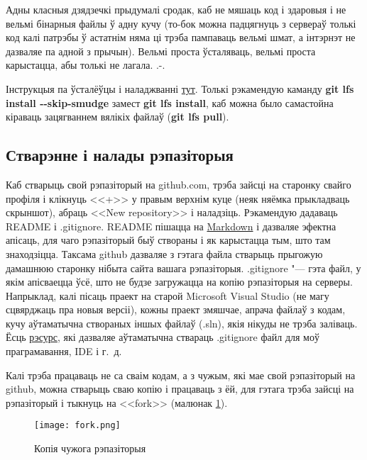 Адны класныя дзядзечкі прыдумалі сродак, каб не мяшаць код і здаровыя і не вельмі бінарныя файлы ў адну кучу (то-бок можна падцягнуць з сервераў толькі код калі патрэбы ў астатнім няма ці трэба пампаваць вельмі шмат, а інтэрнэт не дазваляе па адной з прычын). Вельмі проста ўсталяваць, вельмі проста карыстацца, абы толькі не лагала. .-.

Інструкцыя па ўсталёўцы і наладжванні \href{https://github.com/git-lfs/git-lfs}{тут}. Толькі рэкамендую каманду \textbf{git lfs install -\hspace{1pt}-skip-smudge} замест \textbf{git lfs install}, каб можна было самастойна кіраваць зацягваннем вялікіх файлаў (\textbf{git lfs pull}). 

\subsection{Стварэнне і налады рэпазіторыя}

Каб стварыць свой рэпазіторый на github.com, трэба зайсці на старонку свайго профіля і клікнуць <<+>> у правым верхнім куце (неяк няёмка прыкладваць скрыншот), абраць <<New repository>> і наладзіць. Рэкамендую дадаваць README і .gitignore. README пішацца на \href{https://en.wikipedia.org/wiki/Markdown}{Markdown} і дазваляе эфектна апісаць, для чаго рэпазіторый быў створаны і як карыстацца тым, што там знаходзіцца. Таксама github дазваляе з гэтага файла стварыць прыгожую дамашнюю старонку нібыта сайта вашага рэпазіторыя. .gitignore "--- гэта файл, у якім апісваецца ўсё, што не будзе загружацца на копію рэпазіторыя на серверы. Напрыклад, калі пісаць праект на старой Microsoft Visual Studio (не магу сцвярджаць пра новыя версіі), кожны праект змяшчае, апрача файлаў з кодам, кучу аўтаматычна створаных іншых файлаў (.sln), якія нікуды не трэба заліваць. Ёсць \href{https://www.gitignore.io}{рэсурс}, які дазваляе аўтаматычна ствараць .gitignore файл для моў праграмавання, IDE і г.~д.

Калі трэба працаваць не са сваім кодам, а з чужым, які мае свой рэпазіторый на github, можна стварыць сваю копію і працаваць з ёй, для гэтага трэба зайсці на рэпазіторый і тыкнуць на <<fork>> (малюнак \ref{fork}).

\begin{figure}[H]

\begin{center}
\texttt{[image: fork.png]}
\end{center}

\caption{Копія чужога рэпазіторыя} \label{fork}
\end{figure}

